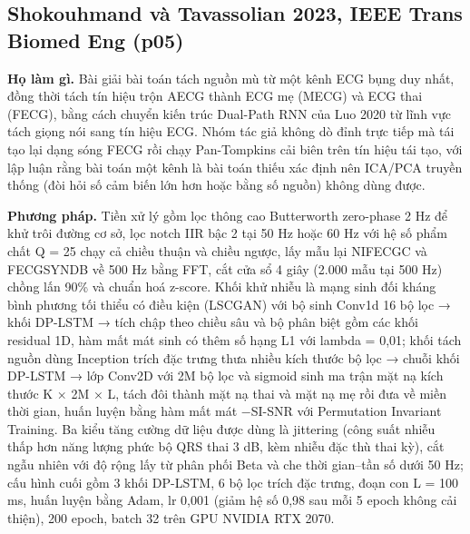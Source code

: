 \documentclass[12pt,a4paper]{article}
\begin{document}
\subsection{Shokouhmand và Tavassolian 2023, IEEE Trans Biomed Eng \normalfont\small (p05)}
\par\vspace{2pt}
\par\vspace{4pt}
\noindent \textbf{Họ làm gì.} Bài giải bài toán tách nguồn mù từ một kênh ECG bụng duy nhất, đồng thời tách tín hiệu trộn AECG thành ECG mẹ (MECG) và ECG thai (FECG), bằng cách chuyển kiến trúc Dual-Path RNN của Luo 2020 từ lĩnh vực tách giọng nói sang tín hiệu ECG. Nhóm tác giả không dò đỉnh trực tiếp mà tái tạo lại dạng sóng FECG rồi chạy Pan-Tompkins cải biên trên tín hiệu tái tạo, với lập luận rằng bài toán một kênh là bài toán thiếu xác định nên ICA/PCA truyền thống (đòi hỏi số cảm biến lớn hơn hoặc bằng số nguồn) không dùng được.\par\vspace{3pt}
\noindent \textbf{Phương pháp.} Tiền xử lý gồm lọc thông cao Butterworth zero-phase 2 Hz để khử trôi đường cơ sở, lọc notch IIR bậc 2 tại 50 Hz hoặc 60 Hz với hệ số phẩm chất Q = 25 chạy cả chiều thuận và chiều ngược, lấy mẫu lại NIFECGC và FECGSYNDB về 500 Hz bằng FFT, cắt cửa sổ 4 giây (2.000 mẫu tại 500 Hz) chồng lấn 90\% và chuẩn hoá z-score. Khối khử nhiễu là mạng sinh đối kháng bình phương tối thiểu có điều kiện (LSCGAN) với bộ sinh Conv1d 16 bộ lọc → khối DP-LSTM → tích chập theo chiều sâu và bộ phân biệt gồm các khối residual 1D, hàm mất mát sinh có thêm số hạng L1 với lambda = 0,01; khối tách nguồn dùng Inception trích đặc trưng thưa nhiều kích thước bộ lọc → chuỗi khối DP-LSTM → lớp Conv2D với 2M bộ lọc và sigmoid sinh ma trận mặt nạ kích thước K × 2M × L, tách đôi thành mặt nạ thai và mặt nạ mẹ rồi đưa về miền thời gian, huấn luyện bằng hàm mất mát −SI-SNR với Permutation Invariant Training. Ba kiểu tăng cường dữ liệu được dùng là jittering (công suất nhiễu thấp hơn năng lượng phức bộ QRS thai 3 dB, kèm nhiễu đặc thù thai kỳ), cắt ngẫu nhiên với độ rộng lấy từ phân phối Beta và che thời gian–tần số dưới 50 Hz; cấu hình cuối gồm 3 khối DP-LSTM, 6 bộ lọc trích đặc trưng, đoạn con L = 100 ms, huấn luyện bằng Adam, lr 0,001 (giảm hệ số 0,98 sau mỗi 5 epoch không cải thiện), 200 epoch, batch 32 trên GPU NVIDIA RTX 2070.\par\vspace{3pt}
\end{document}

